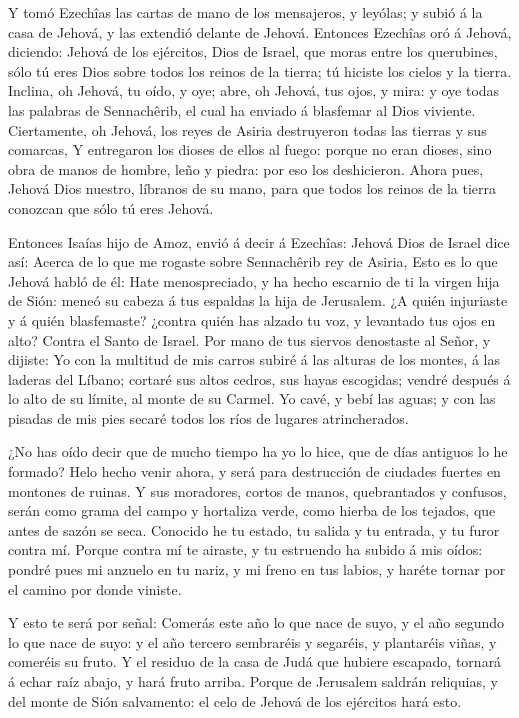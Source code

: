  Y tomó Ezechîas las cartas de mano de los mensajeros, y
leyólas; y subió á la casa de Jehová, y las extendió delante de Jehová.
 Entonces Ezechîas oró á Jehová, diciendo: 
Jehová de los ejércitos, Dios de Israel, que moras entre los querubines,
sólo tú eres Dios sobre todos los reinos de la tierra; tú hiciste los
cielos y la tierra.  Inclina, oh Jehová, tu oído, y oye;
abre, oh Jehová, tus ojos, y mira: y oye todas las palabras de
Sennachêrib, el cual ha enviado á blasfemar al Dios viviente.
 Ciertamente, oh Jehová, los reyes de Asiria destruyeron
todas las tierras y sus comarcas,  Y entregaron los dioses
de ellos al fuego: porque no eran dioses, sino obra de manos de hombre,
leño y piedra: por eso los deshicieron.  Ahora pues, Jehová
Dios nuestro, líbranos de su mano, para que todos los reinos de la
tierra conozcan que sólo tú eres Jehová.

 Entonces Isaías hijo de Amoz, envió á decir á Ezechîas:
Jehová Dios de Israel dice así: Acerca de lo que me rogaste sobre
Sennachêrib rey de Asiria,  Esto es lo que Jehová habló de
él: Hate menospreciado, y ha hecho escarnio de ti la virgen hija de
Sión: meneó su cabeza á tus espaldas la hija de Jerusalem. 
¿A quién injuriaste y á quién blasfemaste? ¿contra quién has alzado tu
voz, y levantado tus ojos en alto? Contra el Santo de Israel.
 Por mano de tus siervos denostaste al Señor, y dijiste: Yo
con la multitud de mis carros subiré á las alturas de los montes, á las
laderas del Líbano; cortaré sus altos cedros, sus hayas escogidas;
vendré después á lo alto de su límite, al monte de su Carmel.
 Yo cavé, y bebí las aguas; y con las pisadas de mis pies
secaré todos los ríos de lugares atrincherados.

 ¿No has oído decir que de mucho tiempo ha yo lo hice, que
de días antiguos lo he formado? Helo hecho venir ahora, y será para
destrucción de ciudades fuertes en montones de ruinas.  Y
sus moradores, cortos de manos, quebrantados y confusos, serán como
grama del campo y hortaliza verde, como hierba de los tejados, que antes
de sazón se seca.  Conocido he tu estado, tu salida y tu
entrada, y tu furor contra mí.  Porque contra mí te
airaste, y tu estruendo ha subido á mis oídos: pondré pues mi anzuelo en
tu nariz, y mi freno en tus labios, y haréte tornar por el camino por
donde viniste.

 Y esto te será por señal: Comerás este año lo que nace de
suyo, y el año segundo lo que nace de suyo: y el año tercero sembraréis
y segaréis, y plantaréis viñas, y comeréis su fruto.  Y el
residuo de la casa de Judá que hubiere escapado, tornará á echar raíz
abajo, y hará fruto arriba.  Porque de Jerusalem saldrán
reliquias, y del monte de Sión salvamento: el celo de Jehová de los
ejércitos hará esto.

